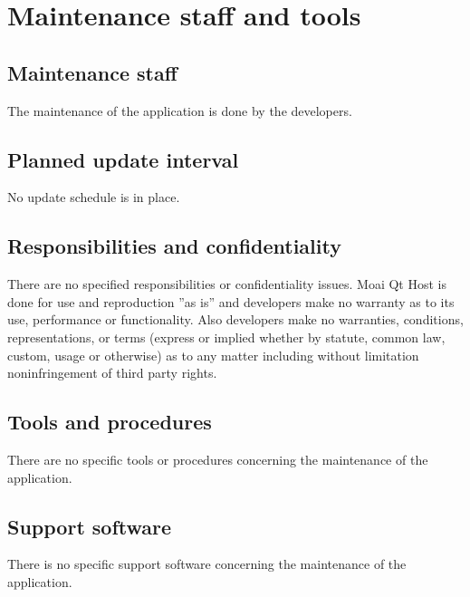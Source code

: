 \chapter{Maintenance staff and tools}

\label{chap:maintstafftools}

\section{Maintenance staff}

The maintenance of the application is done by the developers.

\section{Planned update interval}

No update schedule is in place.

\section{Responsibilities and confidentiality}

There are no specified responsibilities or confidentiality issues. Moai Qt Host is done for use and reproduction ''as is'' and developers make no warranty as to its use, performance or functionality. Also developers \MakeLowercase{MAKE NO WARRANTIES, CONDITIONS, REPRESENTATIONS, OR TERMS (EXPRESS OR IMPLIED WHETHER BY STATUTE, COMMON LAW, CUSTOM, USAGE OR OTHERWISE) AS TO ANY MATTER INCLUDING WITHOUT LIMITATION NONINFRINGEMENT OF THIRD PARTY RIGHTS}.   

\section{Tools and procedures}

There are no specific tools or procedures concerning the maintenance of the application.

\section{Support software}

There is no specific support software concerning the maintenance of the application.
